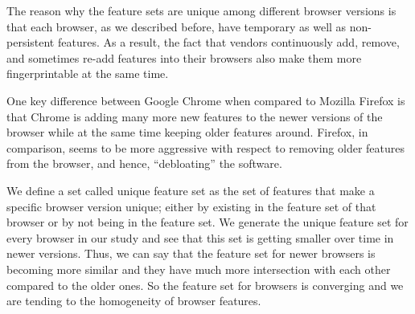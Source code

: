 The reason why the feature sets are unique among different browser
versions is that each browser, as we described before, have temporary
as well as non-persistent features. As a result, the fact that vendors
continuously add, remove, and sometimes re-add features into their
browsers also make them more fingerprintable at the same time.

One key difference between Google Chrome when compared to Mozilla
Firefox is that Chrome is adding many more new features to the newer
versions of the browser while at the same time keeping older features
around. Firefox, in comparison, seems to be more aggressive with
respect to removing older features from the browser, and hence,
``debloating'' the software.

We define a set called unique
feature set as the set of features that make a specific browser
version unique; either by existing in the feature set of that browser
or by not being in the feature set. We generate the unique feature set
for every browser in our study and see that this set is getting
smaller over time in newer versions. Thus, we can say that the feature
set for newer browsers is becoming more similar and they have much
more intersection with each other compared to the older ones. So the
feature set for browsers is converging and we are tending to the
homogeneity of browser features.